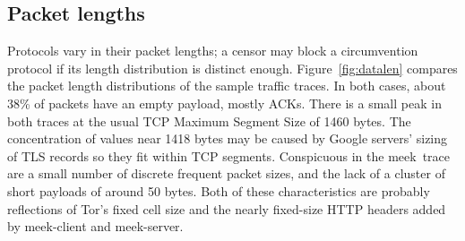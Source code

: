 \documentclass[conference]{IEEEtran}
\newcommand{\meekclient}{\mbox{meek-client}\xspace}
\newcommand{\meekserver}{\mbox{meek-server}\xspace}
\newcommand{\meek}{meek\xspace}
\begin{document}
\subsection{Packet lengths}

Protocols vary in their packet lengths;
a censor may block a circumvention protocol if its length distribution
is distinct enough.
Figure~\ref{fig:datalen}
compares the packet length distributions of the sample traffic traces.
In both cases, about 38\% of packets have an empty payload, mostly ACKs.
There is a small peak in both traces at the usual TCP Maximum Segment Size
of 1460 bytes.
The concentration of values near 1418 bytes
may be caused by Google servers' sizing of TLS records so they fit within TCP segments.
Conspicuous in the \meek\ trace are a small number of
discrete frequent packet sizes,
and the lack of a cluster of short payloads of around 50 bytes.
Both of these characteristics are probably reflections
of Tor's fixed cell size and the nearly fixed-size HTTP headers
added by \meekclient and \meekserver.

%

\end{document}
